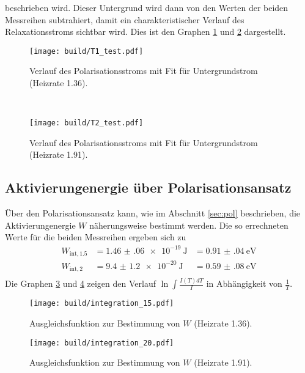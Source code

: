 beschrieben wird. Dieser Untergrund wird dann von den Werten der beiden Messreihen subtrahiert, damit ein charakteristischer Verlauf des Relaxationsstroms sichtbar wird. 
Dies ist den Graphen \ref{fig:unter15} und \ref{fig:unter20} dargestellt. 
\\
\begin{figure}
    \centering
    \texttt{[image: build/T1\_test.pdf]}
    \caption{Verlauf des Polarisationsstroms mit Fit für Untergrundstrom (Heizrate 1.36).}
    \label{fig:unter15}
\end{figure}
\\
\begin{figure}
    \centering
    \texttt{[image: build/T2\_test.pdf]}
    \caption{Verlauf des Polarisationsstroms mit Fit für Untergrundstrom (Heizrate 1.91).}
    \label{fig:unter20}
\end{figure}
\FloatBarrier

\subsection{Aktivierungenergie über Polarisationsansatz}

Über den Polarisationsansatz kann, wie im Abschnitt \ref{sec:pol} beschrieben, die Aktivierungenergie $W$ näherungsweise bestimmt werden.
Die so errechneten Werte für die beiden Messreihen ergeben sich zu 
\begin{align*}
    W_{\text{int},1.5} &= \SI{1.46(06)e-19}{\joule} &= \SI{0.91(04)}{\electronvolt} \\
    W_{\text{int},2}   &= \SI{9.4(12)e-20}{\joule} &= \SI{0.59(08)}{\electronvolt} \\
\end{align*}
Die Graphen  \ref{fig:int15} und \ref{fig:int20} zeigen den Verlauf $\ln{\int{\frac{I(T)dT}{I}}} $ in Abhängigkeit von $\frac{1}{T}$.

\begin{figure}
    \centering
    \texttt{[image: build/integration\_15.pdf]}
    \caption{Ausgleichsfunktion zur Bestimmung von $W$ (Heizrate 1.36).}
    \label{fig:int15}
\end{figure}
\hfill
\begin{figure}
    \centering
    \texttt{[image: build/integration\_20.pdf]}
    \caption{Ausgleichsfunktion zur Bestimmung von $W$ (Heizrate 1.91).}
    \label{fig:int20}
\end{figure}
\FloatBarrier

